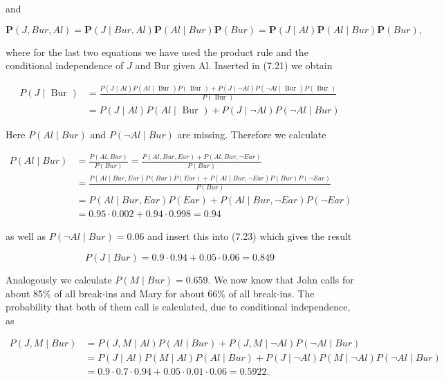 \documentclass[10pt]{article}
\begin{document}
and


\begin{equation*}
\boldsymbol{P}(J, B u r, A l)=\boldsymbol{P}(J \mid B u r, A l) \boldsymbol{P}(A l \mid B u r) \boldsymbol{P}(B u r)=\boldsymbol{P}(J \mid A l) \boldsymbol{P}(A l \mid B u r) \boldsymbol{P}(B u r), \tag{7.22}
\end{equation*}


where for the last two equations we have used the product rule and the conditional independence of $J$ and Bur given Al. Inserted in (7.21) we obtain


\begin{align*}
P(J \mid \text { Bur }) & =\frac{P(J \mid A l) P(A l \mid \text { Bur }) P(\text { Bur })+P(J \mid \neg A l) P(\neg A l \mid \text { Bur }) P(\text { Bur })}{P(\text { Bur })}  \tag{7.23}\\
& =P(J \mid A l) P(A l \mid \text { Bur })+P(J \mid \neg A l) P(\neg A l \mid B u r)
\end{align*}


Here $P(A l \mid B u r)$ and $P(\neg A l \mid B u r)$ are missing. Therefore we calculate

$$
\begin{aligned}
P(A l \mid B u r) & =\frac{P(A l, B u r)}{P(B u r)}=\frac{P(A l, B u r, E a r)+P(A l, B u r, \neg E a r)}{P(B u r)} \\
& =\frac{P(A l \mid B u r, E a r) P(B u r) P(E a r)+P(A l \mid B u r, \neg E a r) P(B u r) P(\neg E a r)}{P(B u r)} \\
& =P(A l \mid B u r, E a r) P(E a r)+P(A l \mid B u r, \neg E a r) P(\neg E a r) \\
& =0.95 \cdot 0.002+0.94 \cdot 0.998=0.94
\end{aligned}
$$

as well as $P(\neg A l \mid B u r)=0.06$ and insert this into (7.23) which gives the result

$$
P(J \mid B u r)=0.9 \cdot 0.94+0.05 \cdot 0.06=0.849
$$

Analogously we calculate $P(M \mid B u r)=0.659$. We now know that John calls for about $85 \%$ of all break-ins and Mary for about $66 \%$ of all break-ins. The probability that both of them call is calculated, due to conditional independence, as

$$
\begin{aligned}
P(J, M \mid B u r) & =P(J, M \mid A l) P(A l \mid B u r)+P(J, M \mid \neg A l) P(\neg A l \mid B u r) \\
& =P(J \mid A l) P(M \mid A l) P(A l \mid B u r)+P(J \mid \neg A l) P(M \mid \neg A l) P(\neg A l \mid B u r) \\
& =0.9 \cdot 0.7 \cdot 0.94+0.05 \cdot 0.01 \cdot 0.06=0.5922 .
\end{aligned}
$$
\end{document}
